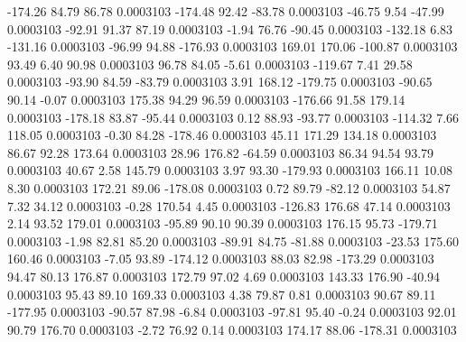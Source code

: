      -174.26       84.79       86.78     0.0003103
     -174.48       92.42      -83.78     0.0003103
      -46.75        9.54      -47.99     0.0003103
      -92.91       91.37       87.19     0.0003103
       -1.94       76.76      -90.45     0.0003103
     -132.18        6.83     -131.16     0.0003103
      -96.99       94.88     -176.93     0.0003103
      169.01      170.06     -100.87     0.0003103
       93.49        6.40       90.98     0.0003103
       96.78       84.05       -5.61     0.0003103
     -119.67        7.41       29.58     0.0003103
      -93.90       84.59      -83.79     0.0003103
        3.91      168.12     -179.75     0.0003103
      -90.65       90.14       -0.07     0.0003103
      175.38       94.29       96.59     0.0003103
     -176.66       91.58      179.14     0.0003103
     -178.18       83.87      -95.44     0.0003103
        0.12       88.93      -93.77     0.0003103
     -114.32        7.66      118.05     0.0003103
       -0.30       84.28     -178.46     0.0003103
       45.11      171.29      134.18     0.0003103
       86.67       92.28      173.64     0.0003103
       28.96      176.82      -64.59     0.0003103
       86.34       94.54       93.79     0.0003103
       40.67        2.58      145.79     0.0003103
        3.97       93.30     -179.93     0.0003103
      166.11       10.08        8.30     0.0003103
      172.21       89.06     -178.08     0.0003103
        0.72       89.79      -82.12     0.0003103
       54.87        7.32       34.12     0.0003103
       -0.28      170.54        4.45     0.0003103
     -126.83      176.68       47.14     0.0003103
        2.14       93.52      179.01     0.0003103
      -95.89       90.10       90.39     0.0003103
      176.15       95.73     -179.71     0.0003103
       -1.98       82.81       85.20     0.0003103
      -89.91       84.75      -81.88     0.0003103
      -23.53      175.60      160.46     0.0003103
       -7.05       93.89     -174.12     0.0003103
       88.03       82.98     -173.29     0.0003103
       94.47       80.13      176.87     0.0003103
      172.79       97.02        4.69     0.0003103
      143.33      176.90      -40.94     0.0003103
       95.43       89.10      169.33     0.0003103
        4.38       79.87        0.81     0.0003103
       90.67       89.11     -177.95     0.0003103
      -90.57       87.98       -6.84     0.0003103
      -97.81       95.40       -0.24     0.0003103
       92.01       90.79      176.70     0.0003103
       -2.72       76.92        0.14     0.0003103
      174.17       88.06     -178.31     0.0003103
